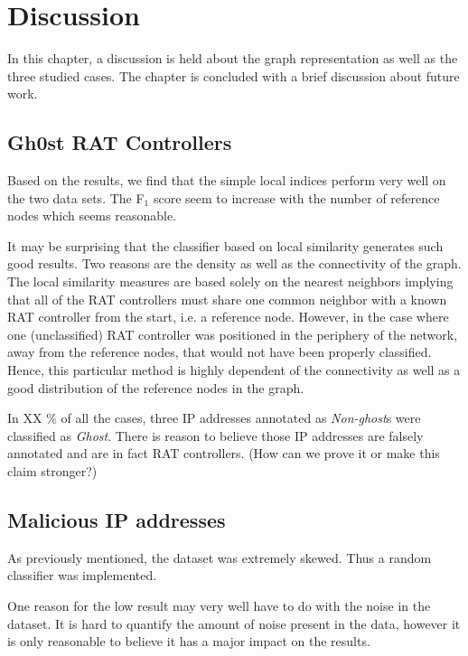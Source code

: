\chapter{Discussion}
In this chapter, a discussion is held about the graph representation as well as the three studied cases. The chapter is concluded with a brief discussion about future work.

\section{Gh0st RAT Controllers}
Based on the results, we find that the simple local indices perform very well on the two data sets. The F$_1$ score seem to increase with the number of reference nodes which seems reasonable. 

It may be surprising that the classifier based on local similarity generates such good results. Two reasons are the density as well as the connectivity of the graph. The local similarity measures are based solely on the nearest neighbors implying that all of the RAT controllers must share one common neighbor with a known RAT controller from the start, i.e. a reference node. However, in the case where one (unclassified) RAT controller was positioned in the periphery of the network, away from the reference nodes, that would not have been properly classified. Hence, this particular method is highly dependent of the connectivity as well as a good distribution of the reference nodes in the graph. 


In XX \% of all the cases, three IP addresses annotated as \textit{Non-ghost}s were classified as \textit{Ghost}. There is reason to believe those IP addresses are falsely annotated and are in fact RAT controllers. (How can we prove it or make this claim stronger?)

\section{Malicious IP addresses}

As previously mentioned, the dataset was extremely skewed. Thus a random classifier was implemented. 

One reason for the low result may very well have to do with the noise in the dataset. It is hard to quantify the amount of noise present in the data, however it is only reasonable to believe it has a major impact on the results.

